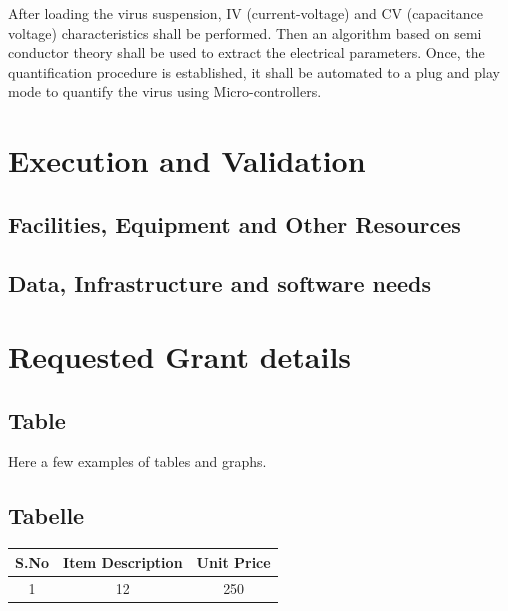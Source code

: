 \documentclass{FR16}
\begin{document}
After loading the virus suspension, IV (current-voltage) and CV (capacitance voltage) characteristics shall be performed. Then an algorithm based on semi conductor theory shall be used to extract the electrical parameters. Once, the quantification procedure is established, it shall be automated to a plug and play mode to quantify the virus using Micro-controllers.





\newpage
\section{Execution and Validation}





\subsection{Facilities, Equipment and Other Resources}





\subsection{Data, Infrastructure and software needs}



\section{Requested Grant details}

\subsection{Table }
Here a few examples of tables and graphs.
\subsection{Tabelle}
\begin{center}
\begin{tabular}{c c c  }
\arrayrulecolor{Azzurro}
\hline
{\bfseries S.No} & {\bfseries Item Description} & {\bfseries Unit Price} \\
\hline
1 & 12 & 250\\
\hline

\hline
\end{tabular}
\end{center}
\end{document}
